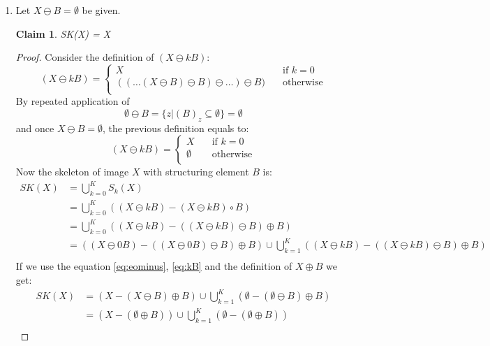 \documentclass[a4paper]{article}
\newtheorem*{claim}{Claim}
\begin{document}
\begin{enumerate}
\item 
Let $X \ominus B = \emptyset$ be given.
\begin{claim}
    SK(X) = X
\end{claim}
\begin{proof}
Consider the definition of $(X \ominus kB)$:
\[
    (X \ominus kB) =
         \begin{cases}
             X      & \quad \text{if } k = 0\\
             ((\dots(X \ominus B) \ominus B) \ominus \dots) \ominus B) & \quad \text{otherwise} \\
         \end{cases}
\]
By repeated application of 
\begin{equation} \label{eq:eominus}
    \emptyset \ominus B = \{z | (B)_{z} \subseteq \emptyset\} = \emptyset
\end{equation}
and once $X \ominus B = \emptyset$, the previous definition equals to:
\begin{equation} \label{eq:kB}
    (X \ominus kB) =
         \begin{cases}
             X      & \quad \text{if } k = 0\\
             \emptyset & \quad \text{otherwise} \\
         \end{cases}
\end{equation}
Now the skeleton of image $X$ with structuring element $B$ is:
\begin{align*}
    SK(X) &= \bigcup_{k = 0}^K S_{k}(X) \\
          &= \bigcup_{k = 0}^K \left((X\ominus kB) - (X \ominus kB) \circ B\right) \\
          &= \bigcup_{k = 0}^K \left((X \ominus kB) - ((X \ominus kB) \ominus B) \oplus B\right) \\
          &= \left((X \ominus 0B) - ((X \ominus 0B) \ominus B) \oplus B\right) \cup \bigcup_{k = 1}^K \left((X \ominus kB) - ((X \ominus kB) \ominus B) \oplus B\right) \\
\end{align*}
If we use the equation \ref{eq:eominus}, \ref{eq:kB} and the definition of $X \oplus B$ we get:
\begin{align*}
    SK(X) &= \left(X - (X \ominus B) \oplus B\right) \cup \bigcup_{k = 1}^K \left(\emptyset - (\emptyset \ominus B) \oplus B\right) \\
          &= \left(X - (\emptyset \oplus B)\right) \cup \bigcup_{k = 1}^K \left(\emptyset - (\emptyset \oplus B)\right) \\

\end{align*}
\end{proof}
\end{enumerate}
\end{document}
